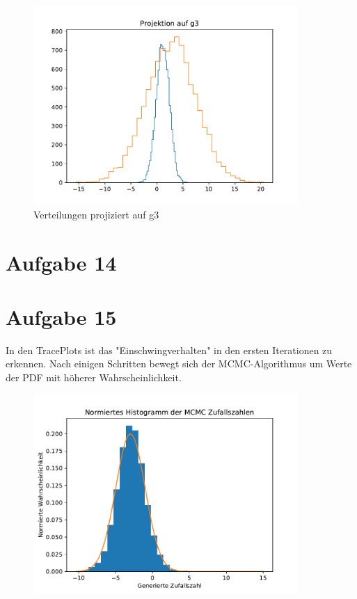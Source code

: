 \begin{figure}[H]
  \centering
  \includegraphics[width=0.9\textwidth]{13_P0_g3.pdf}
  \caption{Verteilungen projiziert auf g3}
\end{figure}






\section{Aufgabe 14}



\section{Aufgabe 15}
In den TracePlots ist das "Einschwingverhalten" in den ersten Iterationen zu erkennen.
Nach einigen Schritten bewegt sich der MCMC-Algorithmus um Werte der PDF mit höherer Wahrscheinlichkeit.
\begin{figure}[H]
  \centering
  \includegraphics[width=0.9\textwidth]{15_hist.pdf}
  \caption{}
\end{figure}


